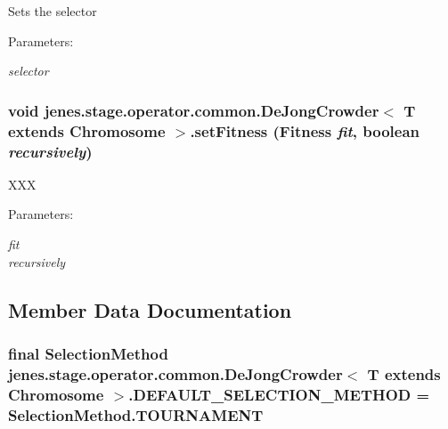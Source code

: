 Sets the selector \begin{Desc}
\item[Parameters:]
\begin{description}
\item[{\em selector}]\end{description}
\end{Desc}
\hypertarget{classjenes_1_1stage_1_1operator_1_1common_1_1_de_jong_crowder_3_01_t_01extends_01_chromosome_01_4_856473a5ced464b1923545059c9f2e67}{
\subsubsection[setFitness]{\setlength{\rightskip}{0pt plus 5cm}void jenes.stage.operator.common.DeJongCrowder$<$ T extends Chromosome $>$.setFitness (Fitness {\em fit}, \/  boolean {\em recursively})}}
\label{classjenes_1_1stage_1_1operator_1_1common_1_1_de_jong_crowder_3_01_t_01extends_01_chromosome_01_4_856473a5ced464b1923545059c9f2e67}


XXX \begin{Desc}
\item[Parameters:]
\begin{description}
\item[{\em fit}]\item[{\em recursively}]\end{description}
\end{Desc}


\subsection{Member Data Documentation}
\hypertarget{classjenes_1_1stage_1_1operator_1_1common_1_1_de_jong_crowder_3_01_t_01extends_01_chromosome_01_4_21277e6e0728d4e83cc353337bc5f66d}{
\subsubsection[DEFAULT\_\-SELECTION\_\-METHOD]{\setlength{\rightskip}{0pt plus 5cm}final {\bf SelectionMethod} jenes.stage.operator.common.DeJongCrowder$<$ T extends Chromosome $>$.{\bf DEFAULT\_\-SELECTION\_\-METHOD} = SelectionMethod.TOURNAMENT}}
\label{classjenes_1_1stage_1_1operator_1_1common_1_1_de_jong_crowder_3_01_t_01extends_01_chromosome_01_4_21277e6e0728d4e83cc353337bc5f66d}


